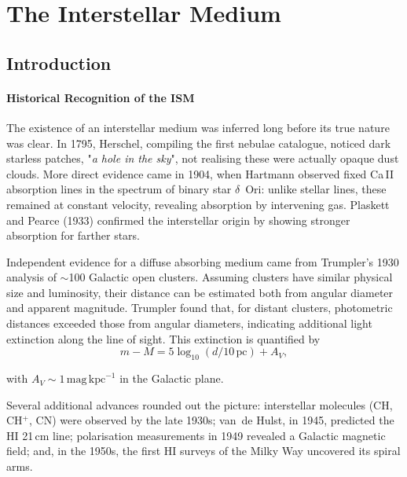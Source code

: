\chapter{The Interstellar Medium} \label{ch:ism}

\vspace{-0.3em}

\section{Introduction}

\subsubsection{Historical Recognition of the ISM} \label{subsec:ism_history}

The existence of an interstellar medium was inferred long before its true nature was clear. In 1795, Herschel, compiling the first nebulae catalogue, noticed dark starless patches, "\textit{a hole in the sky}", not realising these were actually opaque dust clouds. More direct evidence came in 1904, when Hartmann observed fixed Ca\,II absorption lines in the spectrum of binary star $\delta$~Ori: unlike stellar lines, these remained at constant velocity, revealing absorption by intervening gas. Plaskett and Pearce (1933) confirmed the interstellar origin by showing stronger absorption for farther stars. 

\smallskip

Independent evidence for a diffuse absorbing medium came from Trumpler's 1930 analysis of $\sim$100 Galactic open clusters. Assuming clusters have similar physical size and luminosity, their distance can be estimated both from angular diameter and apparent magnitude. Trumpler found that, for distant clusters, photometric distances exceeded those from angular diameters, indicating additional light extinction along the line of sight. This extinction is quantified by
$$
m - M = 5\log_{10}(d/10\,\text{pc}) + A_V ,
$$

\vspace{-0.3em}

with $A_V \sim 1\,\text{mag}\,\text{kpc}^{-1}$ in the Galactic plane. 

\smallskip

Several additional advances rounded out the picture: interstellar molecules (CH, CH$^+$, CN) were observed by the late 1930s; van~de Hulst, in 1945, predicted the HI 21\,cm line; polarisation measurements in 1949 revealed a Galactic magnetic field; and, in the 1950s, the first HI surveys of the Milky Way uncovered its spiral arms.

